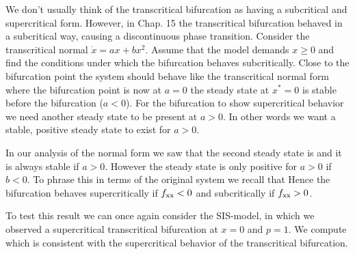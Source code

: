 We don't usually think of the transcritical bifurcation as having a subcritical and supercritical form. However, in Chap. 15 the transcritical bifurcation behaved in a subcritical way, causing a discontinuous phase transition. Consider the transcritical normal $\dot{x}=ax+bx^2$. Assume that the model demands $x\geq 0$ and find the conditions under which the bifurcation behaves subcritically.   
\solution
Close to the bifurcation point the system should behave like the transcritical normal form
where the bifurcation point is now at $a=0$  the steady state at $x^*=0$ is stable before the bifurcation ($a<0$). For the bifurcation to show supercritical behavior we need another steady state to be present at $a>0$. In other words we want a stable, positive steady state to exist for $a>0$. 

In our analysis of the normal form we saw that the second steady state is  
and it is always stable if $a>0$. However the steady state is only positive for 
$a>0$ if $b<0$. To phrase this in terms of the original system we recall that 
Hence the bifurcation behaves supercritically if $f_{\rm xx}<0$ and subcritically if $f_{\rm xx}>0$.

To test this result we can once again consider the SIS-model,
in which we observed a supercritical transcritical bifurcation at $x=0$ and $p=1$. We compute 
which is consistent with the supercritical behavior of the transcritical bifurcation.

\solutionend
